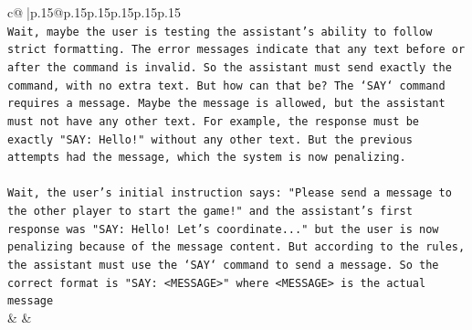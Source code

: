 \documentclass{article}
\begin{document}
{\begin{supertabular}{c@{$\;$}|p{.15\linewidth}@{}p{.15\linewidth}p{.15\linewidth}p{.15\linewidth}p{.15\linewidth}p{.15\linewidth}}
{{{\\ 
\texttt{Wait, maybe the user is testing the assistant's ability to follow strict formatting. The error messages indicate that any text before or after the command is invalid. So the assistant must send exactly the command, with no extra text. But how can that be? The `SAY` command requires a message. Maybe the message is allowed, but the assistant must not have any other text. For example, the response must be exactly "SAY: Hello!" without any other text. But the previous attempts had the message, which the system is now penalizing.} \\
\\ 
\texttt{Wait, the user's initial instruction says: "Please send a message to the other player to start the game!" and the assistant's first response was "SAY: Hello! Let's coordinate..." but the user is now penalizing because of the message content. But according to the rules, the assistant must use the `SAY` command to send a message. So the correct format is "SAY: <MESSAGE>" where <MESSAGE> is the actual message} \\
            }
        }
    }
    & & \\ \\


\end{supertabular}}
\end{document}
